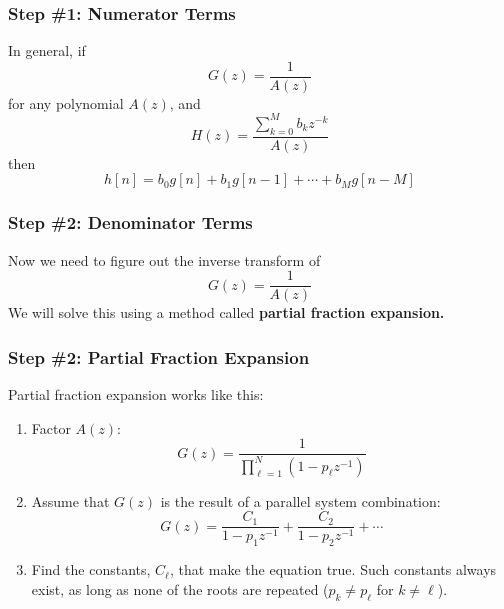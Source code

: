 \documentclass{beamer}
\begin{document}
\begin{frame}
  \frametitle{Step \#1: Numerator Terms}

  In general, if 
  \begin{displaymath}
    G(z) = \frac{1}{A(z)}
  \end{displaymath}
  for any polynomial $A(z)$, and
  \begin{displaymath}
    H(z) = \frac{\sum_{k=0}^M b_kz^{-k}}{A(z)}
  \end{displaymath}
  then
  \begin{displaymath}
    h[n] = b_0 g[n]+b_1g[n-1]+\cdots+b_M g[n-M]
  \end{displaymath}
\end{frame}

\begin{frame}
  \frametitle{Step \#2: Denominator Terms}

  Now we need to figure out the inverse transform of
  \begin{displaymath}
    G(z) = \frac{1}{A(z)}
  \end{displaymath}
  We will solve this using  a method called {\bf partial fraction expansion.}
\end{frame}

\begin{frame}
  \frametitle{Step \#2: Partial Fraction Expansion}
  Partial fraction expansion works like this:
  \begin{enumerate}
  \item Factor $A(z)$:
    \begin{displaymath}
      G(z) = \frac{1}{\prod_{\ell=1}^N \left(1-p_\ell z^{-1}\right)}
    \end{displaymath}
  \item Assume that $G(z)$ is the result of a parallel system
    combination:
    \begin{displaymath}
      G(z) = \frac{C_1}{1-p_1z^{-1}} + \frac{C_2}{1-p_2z^{-1}} + \cdots
    \end{displaymath}
  \item Find the constants, $C_\ell$, that make the equation true.
    Such constants always exist, as long as none of the roots are
    repeated ($p_k\ne p_\ell$ for $k\ne\ell$).
  \end{enumerate}
\end{frame}
\end{document}
